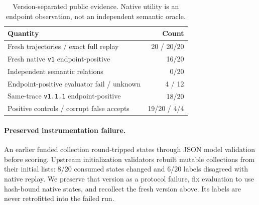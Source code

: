 \begin{table}[t]
\centering\small
\caption{Version-separated public evidence. Native utility is an endpoint observation, not an independent semantic oracle.}
\label{tab:actual-public-audit}
\begin{tabular}{@{}lr@{}}
\toprule
Quantity & Count \\
\midrule
Fresh trajectories / exact full replay & 20 / 20/20 \\
Fresh native \texttt{v1} endpoint-positive & 16/20 \\
Independent semantic relations & 0/20 \\
Endpoint-positive evaluator fail / unknown & 4 / 12 \\
Same-trace \texttt{v1.1.1} endpoint-positive & 18/20 \\
Positive controls / corrupt false accepts & 19/20 / 4/4 \\
\bottomrule
\end{tabular}
\end{table}

\paragraph{Preserved instrumentation failure.} An earlier funded collection round-tripped states through JSON model validation before scoring. Upstream initialization validators rebuilt mutable collections from their initial lists: 8/20 consumed states changed and 6/20 labels disagreed with native replay. We preserve that version as a protocol failure, fix evaluation to use hash-bound native states, and recollect the fresh version above. Its labels are never retrofitted into the failed run.
